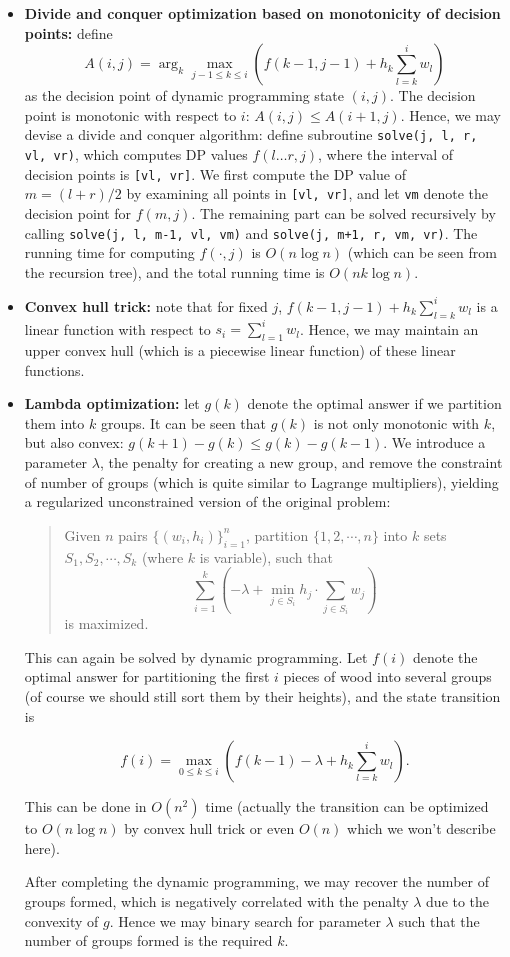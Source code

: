 \documentclass[a4paper,10.5pt,twoside]{article}
\begin{document}
\begin{itemize}
\item \textbf{Divide and conquer optimization based on monotonicity of decision points:} define 
$$A(i, j) = \arg_k\max_{j-1 \leq k \leq i} \left( f(k-1, j-1) + h_{k} \sum_{l = k}^i w_l \right)$$
as the decision point of dynamic programming state $(i, j)$. The decision point is monotonic with respect to $i$: $A(i, j) \leq A(i+1, j)$. Hence, we may devise a divide and conquer algorithm: define subroutine \verb|solve(j, l, r, vl, vr)|, which computes DP values $f(l \ldots r, j)$, where the interval of decision points is \verb|[vl, vr]|. We first compute the DP value of $m = (l+r)/2$ by examining all points in \verb|[vl, vr]|, and let \verb|vm| denote the decision point for $f(m, j)$. The remaining part can be solved recursively by calling \verb|solve(j, l, m-1, vl, vm)| and \verb|solve(j, m+1, r, vm, vr)|. The running time for computing $f(\cdot, j)$ is $O(n \log n)$ (which can be seen from the recursion tree), and the total running time is $O(nk \log n)$.
\item \textbf{Convex hull trick:} note that for fixed $j$, $f(k-1, j-1) + h_{k} \sum_{l = k}^i w_l$ is a linear function with respect to $s_i = \sum_{l = 1}^i w_l$. Hence, we may maintain an upper convex hull (which is a piecewise linear function) of these linear functions.
\item \textbf{Lambda optimization:} let $g(k)$ denote the optimal answer if we partition them into $k$ groups. It can be seen that $g(k)$ is not only monotonic with $k$, but also convex: $g(k+1) - g(k) \leq g(k) - g(k-1)$. We introduce a parameter $\lambda$, the penalty for creating a new group, and remove the constraint of number of groups (which is quite similar to Lagrange multipliers), yielding a regularized unconstrained version of the original problem:

\begin{quote}
Given $n$ pairs $\{(w_i, h_i)\}_{i=1}^n$, partition $\{1, 2, \cdots, n\}$ into $k$ sets $S_1, S_2, \cdots, S_k$ (where $k$ is variable), such that 
$$ \sum_{i=1}^k \left(-\lambda + \min_{j \in S_i} h_j \cdot \sum_{j \in S_i} w_j\right)$$
is maximized.
\end{quote}

This can again be solved by dynamic programming. Let $f(i)$ denote the optimal answer for partitioning the first $i$ pieces of wood into several groups (of course we should still sort them by their heights), and the state transition is

$$ f(i) = \max_{0 \leq k \leq i} \left(f(k-1) - \lambda  + h_{k} \sum_{l = k}^i w_l \right). $$

This can be done in $O(n^2)$ time (actually the transition can be optimized to $O(n \log n)$ by convex hull trick or even $O(n)$ which we won't describe here).

After completing the dynamic programming, we may recover the number of groups formed, which is negatively correlated with the penalty $\lambda$ due to the convexity of $g$. Hence we may binary search for parameter $\lambda$ such that the number of groups formed is the required $k$.
\end{itemize}
\end{document}
